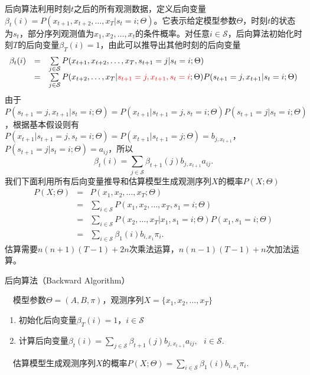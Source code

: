 后向算法利用时刻$t$之后的所有观测数据，定义后向变量$\beta_t(i)=P(x_{t+1},x_{t+2},\ldots,x_T|s_t=i;\Theta)$。它表示给定模型参数$\Theta$，时刻$t$的状态为$s_t$，部分序列观测值为$x_1,x_2,\ldots,x_t$的条件概率。对任意$i\in \mathcal S$，后向算法初始化时刻$T$的后向变量$\beta_T(i)=1$，由此可以推导出其他时刻的后向变量
\begin{equation}
\begin{array}{lcl}
    \beta_t(i) &=& \sum\limits_{j\in \mathcal S} P(x_{t+1},x_{t+2},\ldots,x_T,s_{t+1}=j|s_t=i;\Theta)\\
    &=& \sum\limits_{j\in \mathcal S} P(x_{t+2},\ldots,x_T|\textcolor{red}{s_{t+1}=j,x_{t+1},s_t=i};\Theta)P(s_{t+1}=j,x_{t+1}|s_t=i;\Theta)
\end{array}
\end{equation}
由于$P(s_{t+1}=j,x_{t+1}|s_t=i;\Theta) = P(x_{t+1}|s_{t+1}=j,s_t=i;\Theta)P(s_{t+1}=j|s_t=i;\Theta)$，根据基本假设则有
$P(x_{t+1}|s_{t+1}=j,s_t=i;\Theta)=P(x_{t+1}|s_{t+1}=j;\Theta)=b_{j,x_{t+1}}$，$P(s_{t+1}=j|s_t=i;\Theta)=a_{ij}$，所以
\begin{equation}\label{eq:backwardbeta}
    \beta_t(i)=\sum\limits_{j\in \mathcal S} \beta_{t+1}(j) b_{j,x_{t+1}} a_{ij}.
\end{equation}
我们下面利用所有后向变量推导和估算模型生成观测序列$X$的概率$P(X;\Theta)$
\begin{equation}
\begin{array}{lcl}
    P(X;\Theta)&=&P(x_1,x_2,\ldots,x_T;\Theta)\\
    &=&\sum\limits_{i\in \mathcal S} P(x_1,x_2,\ldots,x_T,s_1=i;\Theta)\\
    &=&\sum\limits_{i\in \mathcal S} P(x_2,\ldots,x_T|x_1,s_1=i;\Theta)P(x_1,s_1=i;\Theta)\\
    &=&\sum\limits_{i\in \mathcal S} \beta_1(i) b_{i,x_1} \pi_i.
\end{array}
\end{equation}
估算需要$n(n+1)(T-1)+2n$次乘法运算，$n(n-1)(T-1)+n$次加法运算。

\begin{algorithm}[htbp]
\caption{后向算法（Backward Algorithm）}
\begin{algorithmic}
    \REQUIRE ~~模型参数$\Theta=(A,B,\pi)$，观测序列$X=\{x_1,x_2,\ldots,x_T\}$
    \begin{enumerate}[1.]
        \item 初始化后向变量$\beta_T(i)=1$，$i\in \mathcal S$
        \item 计算后向变量$\beta_t(i)=\sum\limits_{j\in \mathcal S} \beta_{t+1}(j) b_{j,x_{t+1}} a_{ij},~~~i\in \mathcal S.$
        \ENDFOR
    \end{enumerate}
    \ENSURE ~~估算模型生成观测序列$X$的概率$P(X;\Theta)=\sum\limits_{i\in \mathcal S} \beta_1(i) b_{i,x_1} \pi_i.$
\end{algorithmic}
\end{algorithm}

